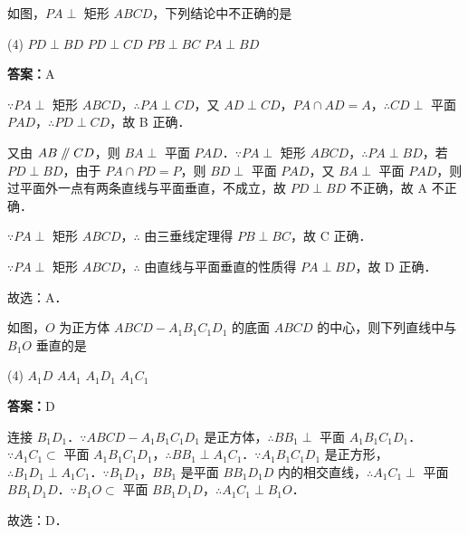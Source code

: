 \vspace{2em}


\begin{example}[\bkstar{2}{5}]
如图，$PA\perp$ 矩形 $ABCD$，下列结论中不正确的是
\begin{tasks}(4)
    \task $PD\perp BD$
    \task $PD\perp CD$
    \task $PB\perp BC$
    \task $PA\perp BD$
\end{tasks}
\end{example}
\begin{solution}
\textbf{答案：}A

$\because PA\perp$ 矩形 $ABCD$，$\therefore PA\perp CD$，又 $AD\perp CD$，$PA\cap AD=A$，$\therefore CD\perp$ 平面 $PAD$，$\therefore PD\perp CD$，故 B 正确．

又由 $AB\mathrel{/\mkern-5mu/} CD$，则 $BA\perp$ 平面 $PAD$．$\because PA\perp$ 矩形 $ABCD$，$\therefore PA\perp BD$，若 $PD\perp BD$，由于 $PA\cap PD=P$，则 $BD\perp$ 平面 $PAD$，又 $BA\perp$ 平面 $PAD$，则过平面外一点有两条直线与平面垂直，不成立，故 $PD\perp BD$ 不正确，故 A 不正确．

$\because PA\perp$ 矩形 $ABCD$，$\therefore$ 由三垂线定理得 $PB\perp BC$，故 C 正确．

$\because PA\perp$ 矩形 $ABCD$，$\therefore$ 由直线与平面垂直的性质得 $PA\perp BD$，故 D 正确．

故选：A．
\end{solution}

\vspace{2em}

\begin{example}[\bkstar{2}{5}]
如图，$O$ 为正方体 $ABCD-A_1B_1C_1D_1$ 的底面 $ABCD$ 的中心，则下列直线中与 $B_1O$ 垂直的是
\begin{tasks}(4)
    \task $A_1D$
    \task $AA_1$
    \task $A_1D_1$
    \task $A_1C_1$
\end{tasks}
\end{example}
\begin{solution}
\textbf{答案：}D

连接 $B_1D_1$．$\because ABCD-A_1B_1C_1D_1$ 是正方体，$\therefore BB_1\perp$ 平面 $A_1B_1C_1D_1$．$\because A_1C_1\subset$ 平面 $A_1B_1C_1D_1$，$\therefore BB_1\perp A_1C_1$．$\because A_1B_1C_1D_1$ 是正方形，$\therefore B_1D_1\perp A_1C_1$．$\because B_1D_1$，$BB_1$ 是平面 $BB_1D_1D$ 内的相交直线，$\therefore A_1C_1\perp$ 平面 $BB_1D_1D$．$\because B_1O\subset$ 平面 $BB_1D_1D$，$\therefore A_1C_1\perp B_1O$．

故选：D．
\end{solution}

